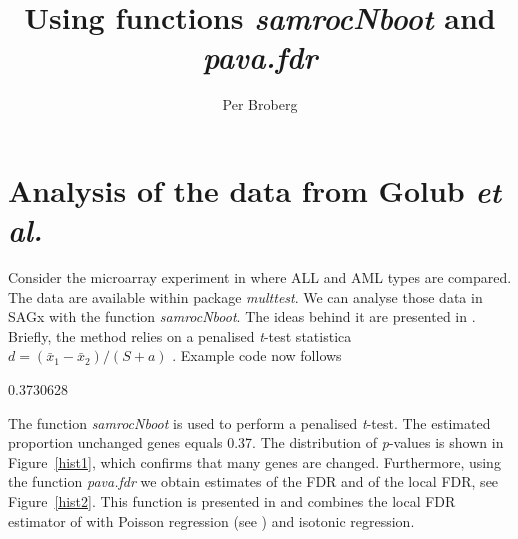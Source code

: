 \documentclass[a4paper]{article}
\begin{document}
\title{Using functions \textit{samrocNboot} and \textit{pava.fdr}}

\author{Per Broberg}

\maketitle

\section*{Analysis of the data from Golub \textit{et al.}}

Consider the microarray experiment in \cite{golubetal} where ALL and AML types are compared.
The data are available within package \textit{multtest}. We can analyse those data in SAGx  with the function \textit{samrocNboot}. The ideas behind
it are presented in \cite{broberg:2003}. Briefly, the method relies on a penalised \textit{t}-test statistica $ d = (\bar{x}_1 - \bar{x}_2)/(S + a)$ \cite{efron:2001}. Example code now follows

\begin{Schunk}
\begin{Soutput}
[1] 0.3730628
\end{Soutput}
\end{Schunk}
The function \textit{samrocNboot} is used to perform a penalised
\textit{t}-test. The estimated proportion unchanged genes equals
0.37. The distribution of \textit{p}-values is shown in
Figure~\ref{hist1}, which confirms that many genes are changed.
Furthermore, using the function \textit{pava.fdr} we obtain
estimates of the FDR and of the local FDR, see Figure~\ref{hist2}.
This function is presented in \cite{broberg:2005} and combines the
local FDR estimator of \cite{aubert:2004} with Poisson regression
(see \cite{efron:2004}) and isotonic regression.
\end{document}
